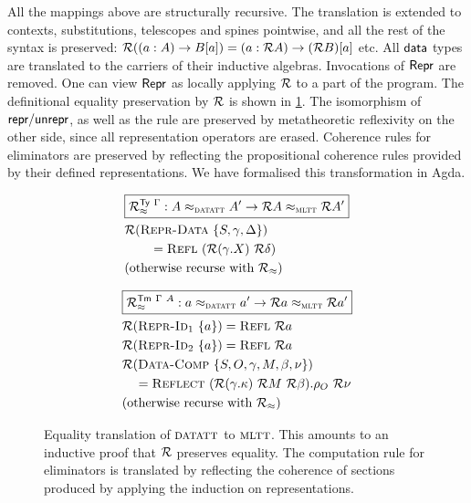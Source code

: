 All the mappings above are structurally recursive. The translation is
extended to contexts, substitutions, telescopes and spines pointwise, and all
the rest of the syntax is preserved: $\mathcal{R}((a : A) \to B[a]) = (a : \mathcal{R} A) \to (\mathcal{R}
B)[a]$ etc. All $\textsf{data}$ types are translated to the carriers of their inductive
algebras. Invocations of $\textsf{Repr}$ are removed. One can view $\textsf{Repr}$ as locally
applying $\mathcal{R}$ to a part of the program. The definitional equality preservation
by $\mathcal{R}$ is shown in \cref{fig:translation-eq}. The isomorphism of
$\textsf{repr}/\textsf{unrepr}$, as well as the rule  are preserved by
metatheoretic reflexivity on the other side, since all representation operators
are erased. Coherence rules for eliminators are preserved by reflecting the
propositional coherence rules provided by their defined representations. We have
formalised this transformation in Agda.

\begin{figure}[H]
\begin{minipage}[t]{0.45\textwidth}
\begin{align*}
&\boxed{\mathcal{R}_{\approx}^{\textsf{Ty}\ \Gamma} : A \approx_{{\textsc{datatt}}} A' \to \mathcal{R} A \approx_{{\textsc{mltt}}} \mathcal{R} A'} \\
&\mathcal{R} (\textsc{Repr-Data}\ \{S, \gamma, \Delta\}) \\ &\qquad = \textsc{Refl}\ (\mathcal{R}(\gamma.X)\ \mathcal{R} \delta) \\
&\text{(otherwise recurse with $\mathcal{R}_{\approx}$)}
\end{align*}
\end{minipage}\hspace{\fill}%
\begin{minipage}[t]{0.45\textwidth}
\begin{align*}
&\boxed{\mathcal{R}_{\approx}^{\textsf{Tm}\ \Gamma\ A} : a \approx_{{\textsc{datatt}}} a' \to \mathcal{R} a \approx_{{\textsc{mltt}}} \mathcal{R} a'} \\
&\mathcal{R} (\textsc{Repr-Id}_1\ \{a\}) = \textsc{Refl}\ \mathcal{R} a \\
&\mathcal{R} (\textsc{Repr-Id}_2\ \{a\}) = \textsc{Refl}\ \mathcal{R} a \\
&\mathcal{R} (\textsc{Data-Comp}\ \{S, O, \gamma, M, \beta, \nu\})  \\
&\quad = \textsc{Reflect}\ (\mathcal{R} (\gamma.\kappa)\ \mathcal{R} M\ \mathcal{R} \beta).\rho_O\ \mathcal{R}\nu \\
&\text{(otherwise recurse with $\mathcal{R}_\approx$)}
\end{align*}
\end{minipage}
\caption{Equality translation of ${\textsc{datatt}}$ to ${\textsc{mltt}}$. This amounts to
an inductive proof that $\mathcal{R}$ preserves equality. The computation rule for
eliminators is translated by reflecting the coherence of sections produced by
applying the induction on representations.}
\label{fig:translation-eq}
\end{figure}

